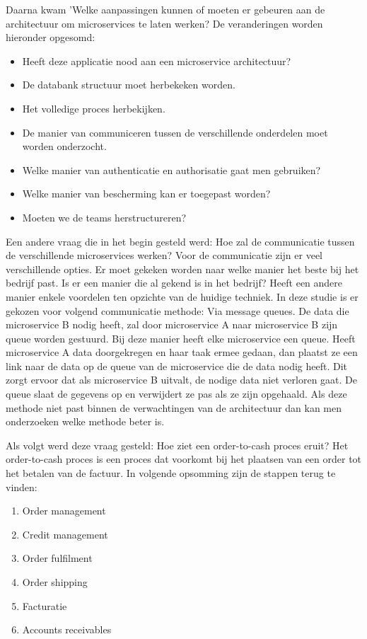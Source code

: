Daarna kwam 'Welke aanpassingen kunnen of moeten er gebeuren aan de architectuur om microservices te laten werken? De veranderingen worden hieronder opgesomd:
\begin{itemize}
	\item Heeft deze applicatie nood aan een microservice architectuur?
	\item De databank structuur moet herbekeken worden.
	\item Het volledige proces herbekijken.
	\item De manier van communiceren tussen de verschillende onderdelen moet worden onderzocht.
	\item Welke manier van authenticatie en authorisatie gaat men gebruiken?
	\item Welke manier van bescherming kan er toegepast worden?
	\item Moeten we de teams herstructureren?
\end{itemize}

Een andere vraag die in het begin gesteld werd: Hoe zal de communicatie tussen de verschillende microservices werken?
Voor de communicatie zijn er veel verschillende opties. Er moet gekeken worden naar welke manier het beste bij het bedrijf past. Is er een manier die al gekend is in het bedrijf? Heeft een andere manier enkele voordelen ten opzichte van de huidige techniek. In deze studie is er gekozen voor volgend communicatie methode: Via message queues. De data die microservice B nodig heeft, zal door microservice A naar microservice B zijn queue worden gestuurd. Bij deze manier heeft elke microservice een queue. Heeft microservice A data doorgekregen en haar taak ermee gedaan, dan plaatst ze een link naar de data op de queue van de microservice die de data nodig heeft. Dit zorgt ervoor dat als microservice B uitvalt, de nodige data niet verloren gaat. De queue slaat de gegevens op en verwijdert ze pas als ze zijn opgehaald. Als deze methode niet past binnen de verwachtingen van de architectuur dan kan men onderzoeken welke methode beter is. 

Als volgt werd deze vraag gesteld: Hoe ziet een order-to-cash proces eruit? 
Het order-to-cash proces is een proces dat voorkomt bij het plaatsen van een order tot het betalen van de factuur. In volgende opsomming zijn de stappen terug te vinden:
\begin{enumerate}
	\item Order management
	\item Credit management
	\item Order fulfilment
	\item Order shipping
	\item Facturatie
	\item Accounts receivables
\end{enumerate}

